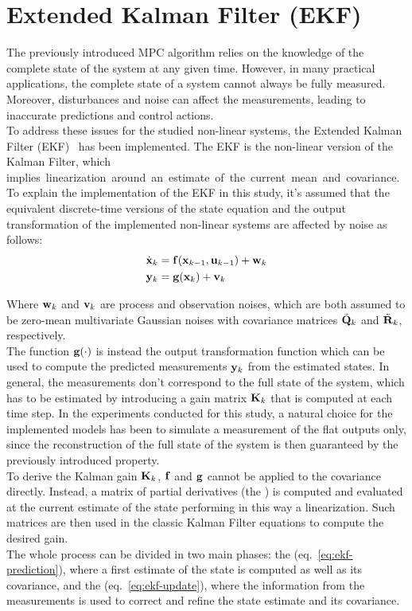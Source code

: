 \documentclass[../main.tex]{subfiles}
\begin{document}
\section{Extended Kalman Filter (EKF)}\label{sec:ekf}

The previously introduced MPC algorithm relies on the knowledge of the complete
state of the system at any given time. However, in many practical applications,
the complete state of a system cannot always be fully measured. Moreover,
disturbances and noise can affect the measurements, leading to inaccurate
predictions and control actions.\\
To address these issues for the studied non-linear systems, the Extended Kalman
Filter (EKF)~\cite{kalman1, kalman2} has been implemented. The EKF is the non-linear version of the
Kalman Filter, which \mbox{implies linearization around an estimate of the current
mean and covariance.}\\
To explain the implementation of the EKF in this study, it's assumed that the
equivalent discrete-time versions of the state equation and the output
transformation of the implemented non-linear systems are affected by noise as
follows:
\begin{equation}
  \begin{aligned}
	  \dot{\mathbf{x}}_k &= \mathbf{f}(\mathbf{x}_{k-1}, \mathbf{u}_{k-1}) + \mathbf{w}_k \\
	  \mathbf{y}_k &= \mathbf{g}(\mathbf{x}_k) + \mathbf{v}_k
  \end{aligned}
\end{equation}

Where $\mathbf{w}_k$ and $\mathbf{v}_k$ are process and observation noises, which
are both assumed to be zero-mean multivariate Gaussian noises with covariance
matrices $\tilde{\mathbf{Q}}_k$ and $\tilde{\mathbf{R}}_k$, respectively.\\
The function $\mathbf{g}(\cdot)$ is instead the output transformation function
which can be used to compute the predicted measurements $\mathbf{y}_k$ from the estimated
states. In general, the measurements don't correspond to the full state of the
system, which has to be estimated by introducing a gain matrix $\mathbf{K}_k$ that
is computed at each time step.
In the experiments conducted for this study, a natural choice for the
implemented models has been to simulate a measurement of the flat outputs only,
since the reconstruction of the full state of the system is then guaranteed by the
previously introduced  property.\\
To derive the Kalman gain $\mathbf{K}_k$, $\mathbf{f}$ and $\mathbf{g}$
cannot be applied to the covariance directly. Instead, a matrix of partial
derivatives (the ) is computed and evaluated at the current
estimate of the state performing in this way a linearization. Such matrices are then used in the
classic Kalman Filter equations to compute the desired gain.\\
The whole process can be divided in two main phases: the 
(eq.~\ref{eq:ekf-prediction}), where a first estimate of the state is computed
as well as its covariance, and the  (eq.~\ref{eq:ekf-update}),
where the information from the measurements is used to correct and refine the state
estimate and its covariance.
\end{document}
